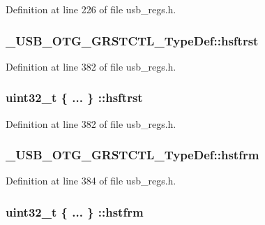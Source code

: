 Definition at line 226 of file usb\-\_\-regs.\-h.

\hypertarget{group___u_s_b___o_t_g___d_r_i_v_e_r_ga0ce950fb04d37c6bfb5ca18fc740b3d3}{
\subsubsection[{hsftrst}]{ \-\_\-\-U\-S\-B\-\_\-\-O\-T\-G\-\_\-\-G\-R\-S\-T\-C\-T\-L\-\_\-\-Type\-Def\-::hsftrst}}\label{group___u_s_b___o_t_g___d_r_i_v_e_r_ga0ce950fb04d37c6bfb5ca18fc740b3d3}


Definition at line 382 of file usb\-\_\-regs.\-h.

\hypertarget{group___u_s_b___o_t_g___d_r_i_v_e_r_ga72cfeb2278a844532c620de636bc2876}{
\subsubsection[{hsftrst}]{\setlength{\rightskip}{0pt plus 5cm}uint32\-\_\-t \{ ... \} \-::hsftrst}}\label{group___u_s_b___o_t_g___d_r_i_v_e_r_ga72cfeb2278a844532c620de636bc2876}


Definition at line 382 of file usb\-\_\-regs.\-h.

\hypertarget{group___u_s_b___o_t_g___d_r_i_v_e_r_ga74ac2a67ad56bfb0d44539efa6dad5bc}{
\subsubsection[{hstfrm}]{ \-\_\-\-U\-S\-B\-\_\-\-O\-T\-G\-\_\-\-G\-R\-S\-T\-C\-T\-L\-\_\-\-Type\-Def\-::hstfrm}}\label{group___u_s_b___o_t_g___d_r_i_v_e_r_ga74ac2a67ad56bfb0d44539efa6dad5bc}


Definition at line 384 of file usb\-\_\-regs.\-h.

\hypertarget{group___u_s_b___o_t_g___d_r_i_v_e_r_ga53c0c708311029bd526cc6df479d3981}{
\subsubsection[{hstfrm}]{\setlength{\rightskip}{0pt plus 5cm}uint32\-\_\-t \{ ... \} \-::hstfrm}}\label{group___u_s_b___o_t_g___d_r_i_v_e_r_ga53c0c708311029bd526cc6df479d3981}


